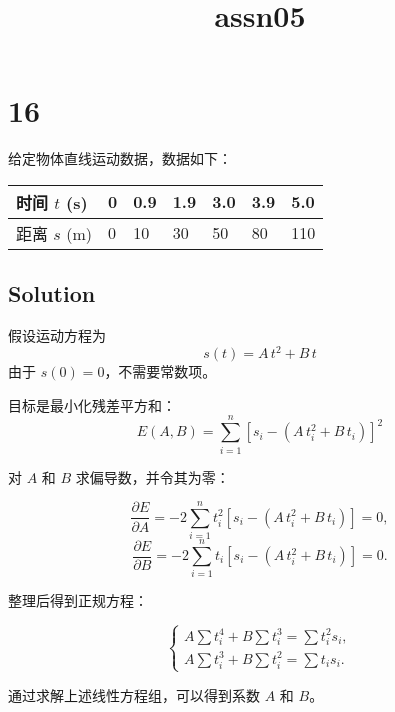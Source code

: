 \documentclass[11pt]{article}
\title{assn05}
\begin{document}
    
    \maketitle
    
    

    
    \section{16}\label{section}

给定物体直线运动数据，数据如下：

\begin{longtable}[]{@{}lllllll@{}}
\toprule\noalign{}
时间 \(t\) (s) & 0 & 0.9 & 1.9 & 3.0 & 3.9 & 5.0 \\
\midrule\noalign{}
\endhead
\bottomrule\noalign{}
\endlastfoot
距离 \(s\) (m) & 0 & 10 & 30 & 50 & 80 & 110 \\
\end{longtable}

\subsection{Solution}\label{solution}

假设运动方程为\\
\[
s(t) = A \, t^2 + B \, t
\] 由于 \(s(0)=0\)，不需要常数项。

目标是最小化残差平方和：\\
\[
E(A,B) = \sum_{i=1}^{n} \left[ s_i - \left( A \, t_i^2 + B \, t_i \right) \right]^2
\]

对 \(A\) 和 \(B\) 求偏导数，并令其为零：

\[
\frac{\partial E}{\partial A} = -2 \sum_{i=1}^{n} t_i^2 \left[ s_i - \left( A \, t_i^2 + B \, t_i \right) \right] = 0,
\] \[
\frac{\partial E}{\partial B} = -2 \sum_{i=1}^{n} t_i \left[ s_i - \left( A \, t_i^2 + B \, t_i \right) \right] = 0.
\]

整理后得到正规方程：

\[
\begin{cases}
A\sum t_i^4 + B\sum t_i^3 = \sum t_i^2 s_i, \\
A\sum t_i^3 + B\sum t_i^2 = \sum t_i s_i.
\end{cases}
\]

通过求解上述线性方程组，可以得到系数 \(A\) 和 \(B\)。
\end{document}
